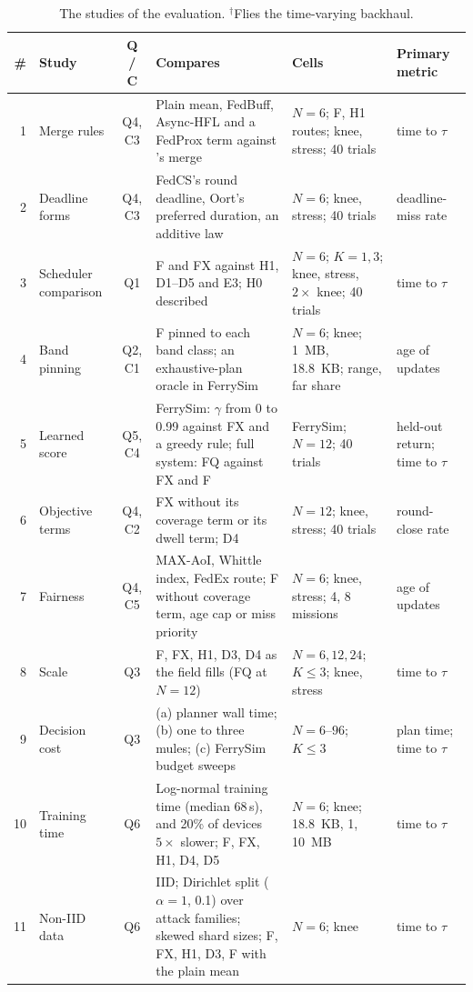 \begin{table}[tp]
\centering
\caption{The studies of the evaluation. $^{\dagger}$Flies the time-varying
backhaul.}
\label{tab:studies}
\footnotesize
\begin{tabularx}{\textwidth}{@{}r l c L l l@{}}
\toprule
\textbf{\#} & \textbf{Study} & \textbf{Q / C} & \textbf{Compares} & \textbf{Cells} & \textbf{Primary metric} \\
 & Merge rules & Q4, C3 & Plain mean, FedBuff, Async-HFL and a FedProx term against \sysname{}'s merge & $N{=}6$; F, H1 routes; knee, stress; 40 trials & time to $\tau$ \\
2 & Deadline forms & Q4, C3 & FedCS's round deadline, Oort's preferred duration, an additive law & $N{=}6$; knee, stress; 40 trials & deadline-miss rate \\
3 & Scheduler comparison & Q1 & F and FX against H1, D1--D5 and E3; H0 described & $N{=}6$; $K{=}1,3$; knee, stress, $2\times$ knee; 40 trials & time to $\tau$ \\
4 & Band pinning & Q2, C1 & F pinned to each band class; an exhaustive-plan oracle in FerrySim & $N{=}6$; knee; 1~MB, 18.8~KB; range, far share & age of updates \\
5 & Learned score & Q5, C4 & FerrySim: $\gamma$ from 0 to 0.99 against FX and a greedy rule; full system: FQ against FX and F & FerrySim; $N{=}12$; 40 trials & held-out return; time to $\tau$ \\
6 & Objective terms & Q4, C2 & FX without its coverage term or its dwell term; D4 & $N{=}12$; knee, stress; 40 trials & round-close rate \\
7 & Fairness & Q4, C5 & MAX-AoI, Whittle index, FedEx route; F without coverage term, age cap or miss priority & $N{=}6$; knee, stress; 4, 8 missions & age of updates \\
8 & Scale & Q3 & F, FX, H1, D3, D4 as the field fills (FQ at $N{=}12$) & $N{=}6,12,24$; $K{\le}3$; knee, stress & time to $\tau$ \\
9 & Decision cost & Q3 & (a) planner wall time; (b) one to three mules; (c) FerrySim budget sweeps & $N{=}6$--$96$; $K{\le}3$ & plan time; time to $\tau$ \\
10 & Training time & Q6 & Log-normal training time (median 68\,s), and 20\% of devices $5\times$ slower; F, FX, H1, D4, D5 & $N{=}6$; knee; 18.8~KB, 1, 10~MB & time to $\tau$ \\
11 & Non-IID data & Q6 & IID; Dirichlet split ($\alpha{=}1$, 0.1) over attack families; skewed shard sizes; F, FX, H1, D3, F with the plain mean & $N{=}6$; knee & time to $\tau$ \\

\end{tabularx}
\end{table}
